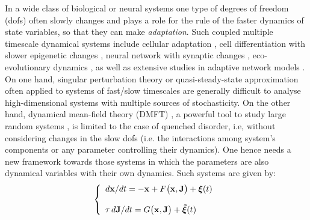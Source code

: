 \documentclass[%
 reprint,
superscriptaddress,
 amsmath,amssymb,
 prl,
]{revtex4-2}
\begin{document}
\maketitle



In a wide class of  biological or neural systems  one type of degrees of freedom (dofs) often slowly  changes and plays a role for the rule of the faster dynamics of state variables, so that they can make \emph{adaptation}. Such  coupled multiple timescale dynamical systems  include   cellular adaptation \cite{Koshland, Stern, Inoue, levine2020phenotypic}, cell differentiation with slower epigenetic changes \cite{Waddington,Li2013, Huang2012, Miyamoto, Matsushita2020}, neural network with synaptic changes \cite{gerstner2014neuronal},  eco-evolutionary dynamics \cite{Post, Moran2022}, as well as extensive studies in adaptive network models \cite{Gross2008,berner2023adaptive}. %
 On one hand,  singular perturbation theory or quasi-steady-state approximation \cite{Kuehn2015} often applied to systems of fast/slow timescales are  generally difficult to analyse high-dimensional systems with multiple sources of stochasticity. On the other hand,  dynamical mean-field theory (DMFT) \cite{Martin, Dominicis,Hertz2017, zou2023}, a powerful tool  to study large random systems  \cite{Sompolinsky, Opper1992, Galla2005, Galla2006,  Yoshino2007,Stern2014,Kadmon2015,Mastrogiuseppe2017,Marti2018, Schuecker2018, Pearce, Altieri2021, Keup, De_Giuli, Baron2023, Poley, Pirey, behera2022}, is  limited  to  the case of quenched disorder, i.e, without considering  changes in the slow dofs (i.e. the interactions among system's components or any parameter controlling their dynamics). One hence needs a new framework towards  those systems in which the parameters are also dynamical variables with their own dynamics. Such systems are given by:
 \begin{equation}
    \left \{ \begin{array}{l} \displaystyle  d\bold{x}/dt = -\bold{x} + F\big(\bold{x}, \bold{J}\big) + \boldsymbol{\xi}(t) \\ \\ \displaystyle  \tau\, d\bold{J}/dt =   G\big(\bold{x}, \bold{J}\big) + \boldsymbol{\tilde{\xi}}(t)
     \end{array} \right.\, 
     \label{general1}
\end{equation}
\end{document}
